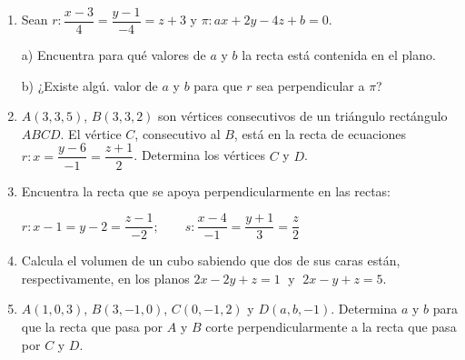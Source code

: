\begin{enumerate}
\vspace{2mm} 

\item Sean $r:\dfrac{x-3}4=\dfrac{y-1}{-4}=z+3$ y $\pi: ax+2y-4z+b=0$.

a) Encuentra para qué valores de $a$ y $b$ la recta está contenida en el plano.

b) ¿Existe algú. valor de $a$ y $b$ para que $r$ sea perpendicular a $\pi$?

\vspace{2mm} 

\item $A(3,3,5)$, $B(3,3,2)$ son vértices consecutivos de un triángulo rectángulo $ABCD$. El vértice $C$, consecutivo al $B$, está en la recta de ecuaciones $r:x=\dfrac{y-6}{-1}=\dfrac{z+1}2$. Determina los vértices $C$ y $D$.

\vspace{2mm} 

\item Encuentra la recta que se apoya perpendicularmente en las rectas:

$r:x-1=y-2=\dfrac{z-1}{-2};\qquad s:\dfrac{x-4}{-1}=\dfrac{y+1}3=\dfrac z 2$

\vspace{2mm} 

\item Calcula el volumen de un cubo sabiendo que dos de sus caras están, respectivamente, en los planos $2x-2y+z=1\;$ y $\;2x-y+z=5$.

\vspace{2mm} 

\item $A(1,0,3)$, $B(3,-1,0)$, $C(0,-1,2)$ y $D(a,b,-1)$. Determina $a$ y $b$ para que la recta que pasa por $A$ y $B$ corte perpendicularmente a la recta que pasa por $C$ y $D$.

\vspace{2mm} 


\end{enumerate}
